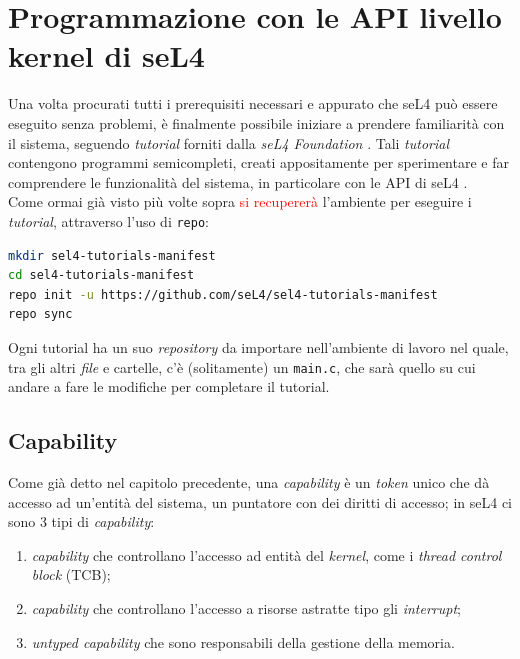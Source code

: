 \section{Programmazione con le API livello kernel di seL4}
Una volta procurati tutti i prerequisiti necessari e appurato che seL4 può essere eseguito senza problemi, è finalmente possibile iniziare a prendere familiarità con il sistema, seguendo \textit{tutorial} forniti dalla \textit{seL4 Foundation} \cite{seL4Tutorial}. Tali \textit{tutorial} contengono programmi semicompleti, creati appositamente per sperimentare e far comprendere le funzionalità del sistema, in particolare con le API di seL4 \cite{sel4API}.\\
Come ormai già visto più volte sopra \textcolor{red}{si recupererà} l'ambiente per eseguire i \textit{tutorial}, attraverso l'uso di \texttt{repo}:
\begin{lstlisting}[language=bash]
mkdir sel4-tutorials-manifest
cd sel4-tutorials-manifest
repo init -u https://github.com/seL4/sel4-tutorials-manifest
repo sync
\end{lstlisting}
Ogni tutorial ha un suo \textit{repository} da importare nell'ambiente di lavoro nel quale, tra gli altri \textit{file} e cartelle, c'è (solitamente) un \texttt{main.c}, che sarà quello su cui andare a fare le modifiche per completare il tutorial.

\subsection{Capability}
Come già detto nel capitolo precedente, una \textit{capability} è un \textit{token} unico che dà accesso ad un'entità del sistema, un puntatore con dei diritti di accesso; in seL4 ci sono 3 tipi di \textit{capability}:
\begin{enumerate}
	\item \textit{capability} che controllano l'accesso ad entità del \textit{kernel}, come i \textit{thread control block} (TCB);
	\item \textit{capability} che controllano l'accesso a risorse astratte tipo gli \textit{interrupt};
	\item \textit{untyped capability} che sono responsabili della gestione della memoria.
\end{enumerate}


